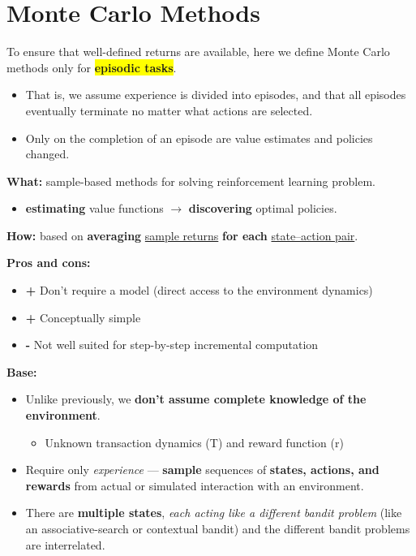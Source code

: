 \documentclass[12pt, a4paper]{article}
\let\stdsection\section
\renewcommand\section{\newpage\stdsection} %
\begin{document}



\section{Monte Carlo Methods}\label{monte-carlo-methods}

\begin{tcolorbox}[colback=yellow!5,colframe=yellow!75!black,title=NOTE]
  To ensure that well-defined returns are available, here we define Monte
  Carlo methods only for \textbf{\colorbox{Yellow}{episodic tasks}}.
  \begin{itemize}
    \item That is, we assume experience is divided into episodes, and that all episodes eventually terminate no matter what actions are selected.
    \item Only on the completion of an episode are value estimates and policies changed.
  \end{itemize}
\end{tcolorbox}

\textbf{What:} sample-based methods for solving reinforcement learning problem.
\begin{itemize}
  \item \textbf{estimating} value functions \(\rightarrow\) \textbf{discovering}
  optimal policies.
\end{itemize}

\textbf{How:} based on \textbf{averaging} \uline{sample returns} \textbf{for
each} \uline{state--action pair}.

\textbf{Pros and cons:}
\begin{itemize}
  \item \textbf{+} Don't require a model (direct access to the environment dynamics)
  \item \textbf{+} Conceptually simple
  \item \textbf{-} Not well suited for step-by-step incremental computation
\end{itemize}

\textbf{Base:}

\begin{itemize}
\item
  Unlike previously, we \textbf{don't assume complete knowledge of the
  environment}.

  \begin{itemize}
  \item
    Unknown transaction dynamics (T) and reward function (r)
  \end{itemize}
\item
  Require only \emph{experience} --- \textbf{sample} sequences of
  \textbf{states, actions, and rewards} from actual or simulated
  interaction with an environment.
\item
  There are \textbf{multiple states}, \emph{each acting like a different
  bandit problem} (like an associative-search or contextual bandit) and
  the different bandit problems are interrelated.
\end{itemize}
\end{document}
